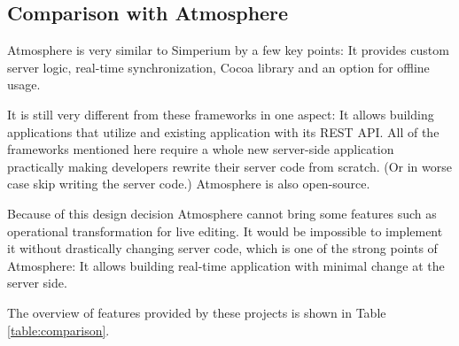 \subsection{Comparison with Atmosphere}


\tabcolsep=10pt
\begin{table}[!hb]
  \centering
  \caption{Comparison of solutions similar to Atmosphere}
  \label{table:comparison}
\end{table}


Atmosphere is very similar to Simperium by a few key points: It provides custom server logic, real-time synchronization, Cocoa library and an option for offline usage.

It is still very different from these frameworks in one aspect: It allows building applications that utilize and existing application with its REST API. All of the frameworks mentioned here require a whole new server-side application practically making developers rewrite their server code from scratch. (Or in worse case skip writing the server code.) Atmosphere is also open-source.

Because of this design decision Atmosphere cannot bring some features such as operational transformation for live editing. It would be impossible to implement it without drastically changing server code, which is one of the strong points of Atmosphere: It allows building real-time application with minimal change at the server side.

The overview of features provided by these projects is shown in Table \ref{table:comparison}.